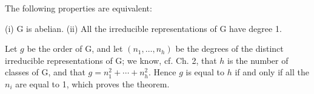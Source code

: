 The following properties are equivalent:

(i) G is abelian.
(ii) All the irreducible representations of G have degree 1.

Let $g$ be the order of G, and let $(n_1, \ldots, n_h)$ be the degrees of the distinct irreducible representations of G; we know, cf. Ch. 2, that $h$ is the number of classes of G, and that $g = n_1^2 + \cdots + n_h^2$. Hence $g$ is equal to $h$ if and only if all the $n_i$ are equal to 1, which proves the theorem.
